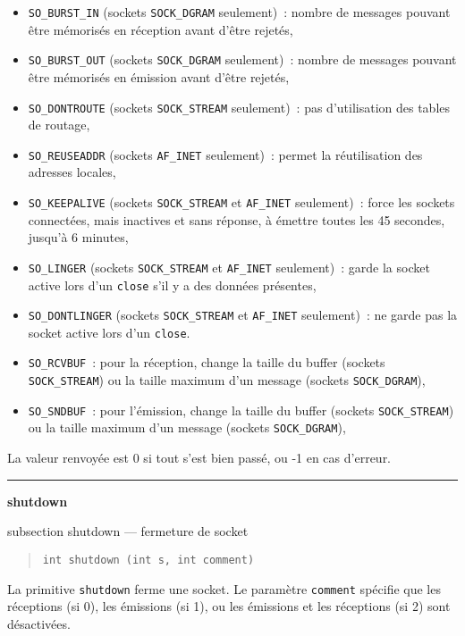 \documentclass [twoside] {report}
\newcommand {\primitive} [1]
    {
	{\large \bf #1}
	\addcontentsline {toc} {subsection} {#1}
    }
\newcommand {\separation}
    {
	\vspace {7mm}
	\nopagebreak
	\hrule
    }
\begin{document}
\begin {itemize}
    \item {\tt SO\_BURST\_IN} (sockets {\tt SOCK\_DGRAM}
	seulement)~: nombre de messages pouvant être mémorisés
	en réception avant d'être rejetés,
    \item {\tt SO\_BURST\_OUT} (sockets {\tt SOCK\_DGRAM}
	seulement)~: nombre de messages pouvant être mémorisés
	en émission avant d'être rejetés,
    \item {\tt SO\_DONTROUTE} (sockets {\tt SOCK\_STREAM}
	seulement)~: pas d'utilisation des tables de
	routage,
    \item {\tt SO\_REUSEADDR} (sockets {\tt AF\_INET}
	seulement)~: permet la réutilisation des adresses
	locales,
    \item {\tt SO\_KEEPALIVE} (sockets {\tt SOCK\_STREAM} et
	{\tt AF\_INET} seulement)~: force les sockets
	connectées, mais inactives et sans réponse, à
	émettre toutes les 45 secondes, jusqu'à 6 minutes,
    \item {\tt SO\_LINGER} (sockets {\tt SOCK\_STREAM} et
	{\tt AF\_INET} seulement)~: garde la socket active
	lors d'un {\tt close} s'il y a des données présentes,
    \item {\tt SO\_DONTLINGER} (sockets {\tt SOCK\_STREAM} et
	{\tt AF\_INET} seulement)~: ne garde pas la socket active
	lors d'un {\tt close}.
    \item {\tt SO\_RCVBUF}~: pour la réception,
	change la taille du buffer
	(sockets {\tt SOCK\_STREAM}) ou la taille
	maximum d'un message (sockets {\tt SOCK\_DGRAM}),
    \item {\tt SO\_SNDBUF}~: pour l'émission,
	change la taille du buffer
	(sockets {\tt SOCK\_STREAM}) ou la taille
	maximum d'un message (sockets {\tt SOCK\_DGRAM}),
\end {itemize}

La valeur renvoyée est 0 si tout s'est bien passé, ou -1 en
cas d'erreur.



\separation
\primitive {shutdown} --- fermeture de socket

\begin {quote}
\begin {verbatim}
int shutdown (int s, int comment)
\end{verbatim}
\end {quote}

La primitive {\tt shutdown} ferme une socket. Le paramètre
{\tt comment} spécifie que les réceptions (si 0), les
émissions (si 1), ou les émissions et les réceptions (si 2) sont
désactivées.
\end{document}

